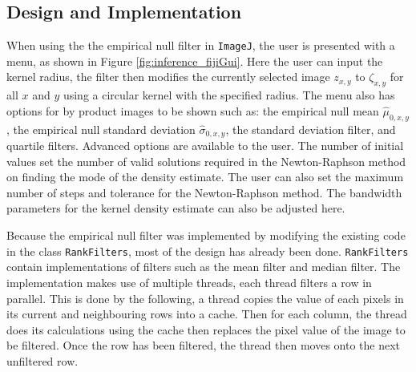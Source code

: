\subsection{Design and Implementation}

When using the the empirical null filter in \texttt{ImageJ}, the user is presented with a menu, as shown in Figure \ref{fig:inference_fijiGui}. Here the user can input the kernel radius, the filter then modifies the currently selected image $z_{x,y}$ to $\zeta_{x,y}$ for all $x$ and $y$ using a circular kernel with the specified radius. The menu also has options for by product images to be shown such as: the empirical null mean $\widehat{\mu}_{0,x,y}$, the empirical null standard deviation $\widehat{\sigma}_{0,x,y}$, the standard deviation filter, and quartile filters. Advanced options are available to the user. The number of initial values set the number of valid solutions required in the Newton-Raphson method on finding the mode of the density estimate. The user can also set the maximum number of steps and tolerance for the Newton-Raphson method. The bandwidth parameters for the kernel density estimate can also be adjusted here.

Because the empirical null filter was implemented by modifying the existing code in the class \texttt{RankFilters}, most of the design has already been done. \texttt{RankFilters} contain implementations of filters such as the mean filter and median filter. The implementation makes use of multiple threads, each thread filters a row in parallel. This is done by the following, a thread copies the value of each pixels in its current and neighbouring rows into a cache. Then for each column, the thread does its calculations using the cache then replaces the pixel value of the image to be filtered. Once the row has been filtered, the thread then moves onto the next unfiltered row.

